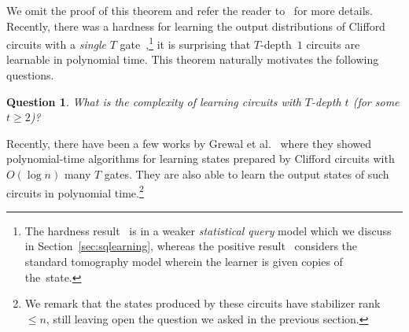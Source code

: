 \documentclass[11pt]{article}
\newcommand{\ket}[1]{|#1\rangle}
\newtheorem{question}{Question}
\begin{document}
We omit the proof of this theorem and refer the reader to~\cite{lai2022learning} for more details.  Recently, there was a  hardness for learning the output distributions of  Clifford circuits with a \emph{single} $T$ gate~\cite{hinsche2022single},\footnote{The hardness result~\cite{hinsche2022single} is in a weaker \emph{statistical query} model which we discuss in Section~\ref{sec:sqlearning}, whereas the positive result~\cite{lai2022learning} considers the standard tomography model wherein the learner is given copies of the~state.} it is surprising that $T$-depth~$1$ circuits are learnable in polynomial time. This theorem naturally motivates the following questions.    

\begin{question}
    What is the complexity of learning circuits with $T$-depth $t$ (for some $t\geq 2$)?
    \end{question}
Recently, there have been a few works by Grewal et al.~\cite{grewal2023improvedlatest,grewal2023improved,grewal2022low} where they showed polynomial-time algorithms for learning states prepared by Clifford circuits  with~$O(\log n)$ many $T$ gates. They are also able to learn the output states of such circuits in polynomial time.\footnote{We remark that the states produced by these circuits have stabilizer rank $\leq n$, still leaving open the question we asked in the previous section.} 
     
\end{document}
